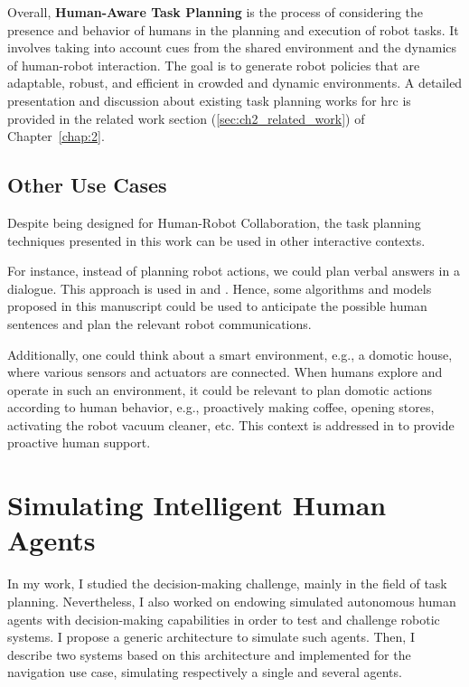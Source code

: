 Overall, \textbf{Human-Aware Task Planning} is the process of considering the presence and behavior of humans in the planning and execution of robot tasks. It involves taking into account cues from the shared environment and the dynamics of human-robot interaction. The goal is to generate robot policies that are adaptable, robust, and efficient in crowded and dynamic environments. A detailed presentation and discussion about existing task planning works for \acrshort{hrc} is provided in the related work section (\ref{sec:ch2_related_work}) of Chapter~\ref{chap:2}.  

\subsection{Other Use Cases}

Despite being designed for Human-Robot Collaboration, the task planning techniques presented in this work can be used in other interactive contexts. 

For instance, instead of planning robot actions, we could plan verbal answers in a dialogue. 
This approach is used in \cite{de_carolis_verbal_2000} and \cite{de_carolis_behavior_2001}.
Hence, some algorithms and models proposed in this manuscript could be used to anticipate the possible human sentences and plan the relevant robot communications. 

Additionally, one could think about a smart environment, e.g., a domotic house, where various sensors and actuators are connected. When humans explore and operate in such an environment, it could be relevant to plan domotic actions according to human behavior, e.g., proactively making coffee, opening stores, activating the robot vacuum cleaner, etc. This context is addressed in \cite{pecora_constraint_based_2012} to provide proactive human support.


\section{Simulating Intelligent Human Agents}

In my work, I studied the decision-making challenge, mainly in the field of task planning. 
Nevertheless, I also worked on endowing simulated autonomous human agents with decision-making capabilities in order to test and challenge robotic systems.
I propose a generic architecture to simulate such agents. Then, I describe two systems based on this architecture and implemented for the navigation use case, simulating respectively a single and several agents. 

